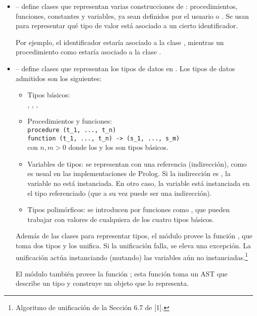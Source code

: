 \documentclass{article}
\begin{document}
\begin{itemize}
\item {} -- define clases que
representan varias cons\-truc\-cio\-nes de \Gbs:
procedimientos, funciones, constantes y varia\-bles,
ya sean definidos por el usuario o .
Se usan para representar qu\'e tipo de valor
est\'a asociado a un cierto identificador.

Por ejemplo,
el identificador  estar\'ia asociado a la clase
, mientras
un procedimiento como  estar\'ia asociado
a la clase .

\item {} -- define clases que representan
los tipos de datos en \Gbs. Los tipos de datos admitidos
son los siguientes:
  \begin{itemize}
  \item Tipos b\'asicos:\\ , , , 
  \item Procedimientos y funciones:\\
        \verb|procedure (t_1, ..., t_n)|\\
        \verb|function (t_1, ..., t_n) -> (s_1, ..., s_m)|\\
        con $n, m > 0$ donde los  y los  son tipos
        b\'asicos.
  \item Variables de tipos: se representan con una referencia
        (indirecci\'on), como es usual en las implementaciones de
        Prolog.
        Si la indirecci\'on es , la variable no est\'a
        instanciada. En otro caso, la variable est\'a instanciada
        en el tipo referenciado (que a su vez puede ser una indirecci\'on).
  \item Tipos polim\'orficos: se introducen por funciones como
        , que pueden trabajar con valores de cualquiera
        de los cuatro tipos b\'asicos.
  \end{itemize}
Adem\'as de las clases para representar tipos,
el m\'odulo provee la funci\'on , que toma
dos tipos y los unifica. Si la unificaci\'on falla,
se eleva una excepci\'on. La unificaci\'on act\'ua
instanciando (mutando) las variables a\'un no instanciadas.\footnote{
Algoritmo de unificaci\'on de la Secci\'on 6.7 de [1].}

El m\'odulo tambi\'en provee la funci\'on ;
esta funci\'on toma un AST que describe un tipo y construye un objeto
que lo representa.


\end{itemize}
\end{document}
